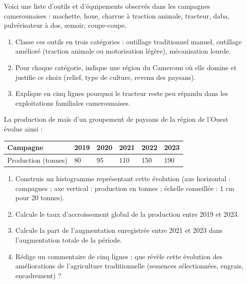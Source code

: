 \documentclass[11pt]{article}
\newcounter{popsec}
\newcounter{popsub}
\newcommand{\courssub}[1]{%
  \stepcounter{popsub}%
  \par\vspace{9pt}\noindent{\popxbold\fontsize{11.5}{13}\selectfont\color{popink}{\color{poporange}\thepopsec.\thepopsub}\hspace{6pt}#1}\par\nopagebreak\vspace{4pt}
}
\begin{document}
\courssub{Je m'entraîne}

\begin{exercice}
Voici une liste d'outils et d'équipements observés dans les campagnes camerounaises : machette, houe, charrue à traction animale, tracteur, daba, pulvérisateur à dos, semoir, coupe-coupe.

\begin{enumerate}
\item Classe ces outils en trois catégories : outillage traditionnel manuel, outillage amélioré (traction animale ou motorisation légère), mécanisation lourde.
\item Pour chaque catégorie, indique une région du Cameroun où elle domine et justifie ce choix (relief, type de culture, revenu des paysans).
\item Explique en cinq lignes pourquoi le tracteur reste peu répandu dans les exploitations familiales camerounaises.
\end{enumerate}
\end{exercice}

\begin{exercice}
La production de maïs d'un groupement de paysans de la région de l'Ouest évolue ainsi :

\begin{center}
\begin{tabularx}{\linewidth}{|l|X|X|X|X|X|}\hline
\rowcolor{popblueL} Campagne & 2019 & 2020 & 2021 & 2022 & 2023 \\ \hline
Production (tonnes) & 80 & 95 & 110 & 150 & 190 \\ \hline
\end{tabularx}
\end{center}

\begin{enumerate}
\item Construis un histogramme représentant cette évolution (axe horizontal : campagnes ; axe vertical : production en tonnes ; échelle conseillée : 1 cm pour 20 tonnes).
\item Calcule le taux d'accroissement global de la production entre 2019 et 2023.
\item Calcule la part de l'augmentation enregistrée entre 2021 et 2023 dans l'augmentation totale de la période.
\item Rédige un commentaire de cinq lignes : que révèle cette évolution des améliorations de l'agriculture traditionnelle (semences sélectionnées, engrais, encadrement) ?
\end{enumerate}
\end{exercice}
\end{document}
